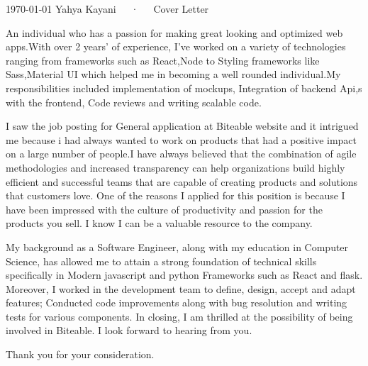 \documentclass[11pt, a4paper]{awesome-cv}
\begin{document}
\makecvheader[R]

\makecvfooter
  {\today}
  {Yahya Kayani~~~·~~~Cover Letter}
  {}

\makelettertitle

\begin{cvletter}

An individual who has a passion for making great looking and optimized web apps.With over 2 years’ of experience, I’ve worked on a
variety of technologies ranging from frameworks such as React,Node to Styling frameworks like Sass,Material UI which helped me
in becoming a well rounded individual.My responsibilities included implementation of mockups, Integration of backend Api,s with
the frontend, Code reviews and writing scalable code.

I saw the job posting for General application at Biteable website and it intrigued me because i had always wanted
to work on products that had a positive impact on a large number of people.I have always believed that the combination of agile methodologies
and increased transparency can help organizations build highly efficient and successful teams that are capable of creating
products and solutions that customers love. One of the reasons I applied for this position is because I have
been impressed with the culture of productivity and passion for the products you sell. I know I can be a valuable resource to the company.

My background as a Software Engineer, along with my education in Computer Science, has allowed me to attain a strong foundation
of technical skills specifically in Modern javascript and python Frameworks such as React and flask. Moreover, I worked in
the development team to define, design, accept and adapt features; Conducted code improvements along with bug resolution and writing tests for various components.
In closing, I am thrilled at the possibility of being involved in Biteable. I look forward to hearing from you.

Thank you for your consideration.


\end{cvletter}


\makeletterclosing
\end{document}
